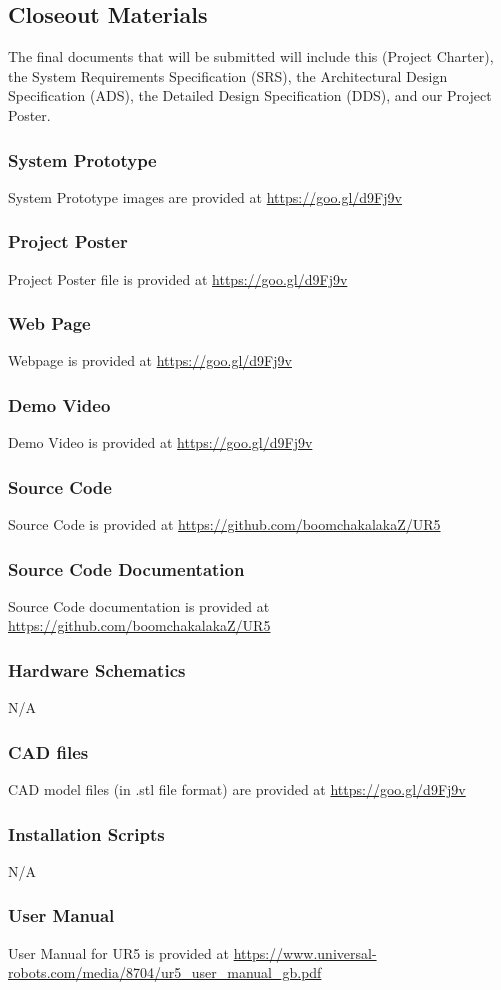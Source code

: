 \subsection{Closeout Materials}
The final documents that will be submitted will include this (Project Charter), the System Requirements Specification (SRS), the Architectural Design Specification (ADS), the Detailed Design Specification (DDS), and our Project Poster.

\subsubsection{System Prototype}
System Prototype images are provided at \url{https://goo.gl/d9Fj9v}

\subsubsection{Project Poster}
Project Poster file is provided at \url{https://goo.gl/d9Fj9v}

\subsubsection{Web Page}
Webpage is provided at \url{https://goo.gl/d9Fj9v}

\subsubsection{Demo Video}
Demo Video is provided at \url{https://goo.gl/d9Fj9v}

\subsubsection{Source Code}
Source Code is provided at \url{https://github.com/boomchakalakaZ/UR5}

\subsubsection{Source Code Documentation}
Source Code documentation is provided at \url{https://github.com/boomchakalakaZ/UR5}

\subsubsection{Hardware Schematics}
N/A

\subsubsection{CAD files}
CAD model files (in .stl file format) are provided at \url{https://goo.gl/d9Fj9v}

\subsubsection{Installation Scripts}
N/A

\subsubsection{User Manual}
User Manual for UR5 is provided at \url{https://www.universal-robots.com/media/8704/ur5_user_manual_gb.pdf}
